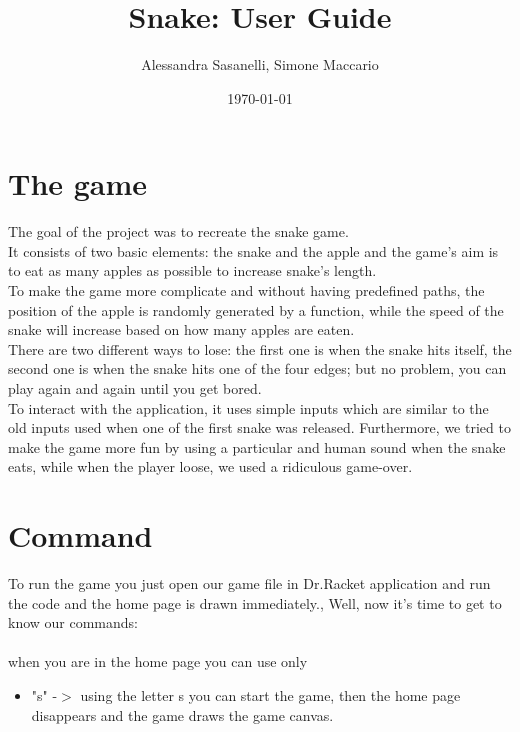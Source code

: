 \documentclass{article}
\title{Snake: User Guide}
\author{Alessandra Sasanelli, Simone Maccario}
\date{\today}
\begin{document}
	\maketitle
	
	\section{The game}
	
	The goal of the project was to recreate the snake game.\\
	It consists of two basic elements: the snake and the apple and the game's aim is to eat as many apples as possible to increase snake's length.\\
	To make the game more complicate and without having predefined paths, the position of the apple is randomly generated by a function, while the speed of the snake will increase based on how many apples are eaten.\\
	There are two different ways to lose: the first one is when the snake hits itself, the second one is when the snake hits one of the four edges; but no problem, you can play again and again until you get bored.\\
	To interact with the application, it uses simple inputs which are similar to the old inputs used when one of the first snake was released.
	Furthermore, we tried to make the game more fun by using a particular and human sound when the snake eats, while when the player loose, we used a ridiculous game-over.
	
	\section{Command}	
	
	To run the game you just open our game file in Dr.Racket application and run the code and the home page is drawn immediately., 
	Well, now it's time to get to know our commands:\\\\
	\noindent when you are in the home page you can use only
	
	\begin{itemize}
		\item "s" -$>$ using the letter s you can start the game, then the home page disappears and the game draws the game canvas.
	\end{itemize}
	
\end{document}
